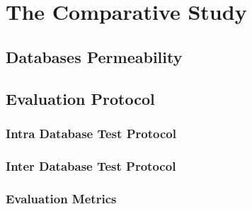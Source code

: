 \chapter{The Comparative Study}
\label{chap:Comparative_Study}

\section{Databases Permeability}
\label{sec:Databases_Permeability}

\section{Evaluation Protocol}
\label{sec:Evaluation_Protocol}

\subsection{Intra Database Test Protocol}
\subsection{Inter Database Test Protocol}
\subsection{Evaluation Metrics}